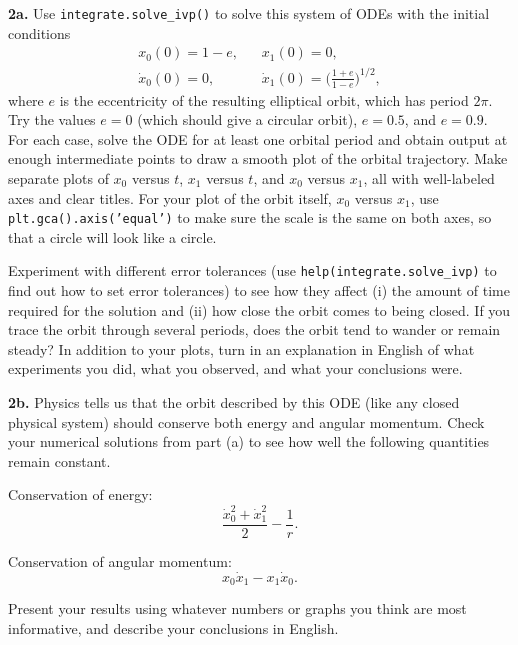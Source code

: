 \documentclass[11pt]{article}
\begin{document}
\par\medskip
{\bf 2a.}
Use {\tt integrate.solve\_ivp()} to solve this system of ODEs with the initial conditions
\begin{align}
x_0(0)      = 1-e, & \;\;\; x_1(0)      = 0, \\
\dot x_0(0) = 0,   & \;\;\; \dot x_1(0) = \Big(\frac{1+e}{1-e}\Big)^{1/2},
\end{align}
where $e$ is the eccentricity of the resulting elliptical orbit,
which has period $2\pi$.
Try the values $e=0$ (which should give a circular orbit),
$e=0.5$, and $e=0.9$.
For each case, solve the ODE for at least one orbital period and obtain output 
at enough intermediate points to draw a smooth plot of the orbital trajectory.
Make separate plots of $x_0$ versus $t$, $x_1$ versus $t$, and $x_0$ versus $x_1$,
all with well-labeled axes and clear titles.
For your plot of the orbit itself, $x_0$ versus  $x_1$, 
use {\tt plt.gca().axis('equal')} to make sure the scale is the same on both axes,
so that a circle will look like a circle.

Experiment with different error tolerances 
(use {\tt help(integrate.solve\_ivp)} to find out how to set error tolerances)
to see how they affect 
(i)  the amount of time required for the solution and 
(ii) how close the orbit comes to being closed.
If you trace the orbit through several periods, 
does the orbit tend to wander or remain steady?
In addition to your plots, 
turn in an explanation in English of what experiments you did,
what you observed, and what your conclusions were.

\par\medskip
{\bf 2b.}
Physics tells us that the orbit described by this ODE
(like any closed physical system) should conserve both energy and angular momentum.
Check your numerical solutions from part (a) to see how well the following
quantities remain constant.

Conservation of energy:
$$\frac{\dot x_0^2 + \dot x_1^2}{2} - \frac{1}{r}.$$

Conservation of angular momentum:
$$x_0\dot x_1 - x_1\dot x_0.$$

Present your results using whatever numbers or graphs you think
are most informative, and describe your conclusions in English.
\end{document}
